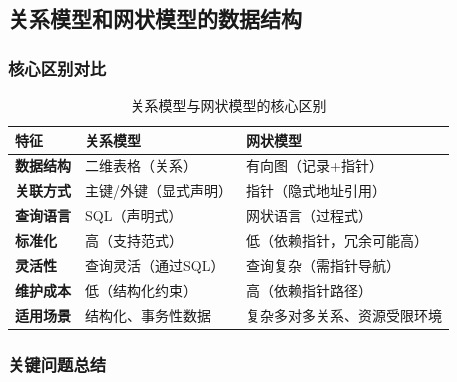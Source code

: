\documentclass[a4paper,12pt,UTF8,fontset=none]{ctexart}
\begin{document}
\subsection{关系模型和网状模型的数据结构}

\subsubsection{核心区别对比}

\begin{table}[h!]
    \centering
    \caption{关系模型与网状模型的核心区别}
    \begin{tabular}{@{}>{\centering\arraybackslash}m{4cm}%
                        >{\arraybackslash}m{6cm}%
                        >{\arraybackslash}m{6cm}@{}}
        \toprule
        \textbf{特征}            & \textbf{关系模型}                          & \textbf{网状模型}                          \\
        \midrule
        \textbf{数据结构}        & 二维表格（关系）                            & 有向图（记录+指针）                        \\
        \textbf{关联方式}        & 主键/外键（显式声明）                       & 指针（隐式地址引用）                       \\
        \textbf{查询语言}        & SQL（声明式）                               & 网状语言（过程式）                         \\
        \textbf{标准化}          & 高（支持范式）                              & 低（依赖指针，冗余可能高）                 \\
        \textbf{灵活性}          & 查询灵活（通过SQL）                         & 查询复杂（需指针导航）                     \\
        \textbf{维护成本}        & 低（结构化约束）                            & 高（依赖指针路径）                         \\
        \textbf{适用场景}        & 结构化、事务性数据                          & 复杂多对多关系、资源受限环境              \\
        \bottomrule
    \end{tabular}
    
\end{table}

\subsubsection{关键问题总结}
\end{document}
